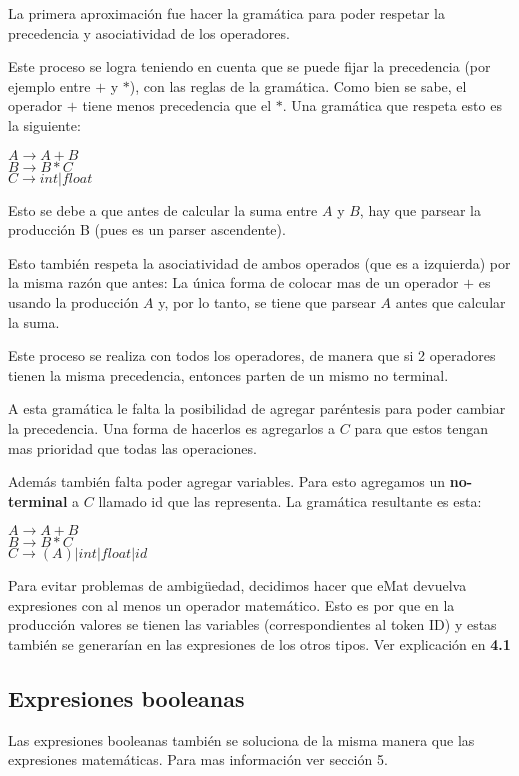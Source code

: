 La primera aproximación fue hacer la gramática para poder respetar la precedencia y asociatividad de los operadores. 

Este proceso se logra teniendo en cuenta que se puede fijar la precedencia (por ejemplo entre $+$ y $*$), con las reglas de la gramática. Como bien se sabe, el operador $+$ tiene menos precedencia que el $*$. Una gramática que respeta esto es la siguiente:

\begin{center}
$A \rightarrow A + B$ \\
$B \rightarrow B * C$ \\
$C \rightarrow int | float$ 
\end{center}
Esto se debe a que antes de calcular la suma entre $A$ y $B$, hay que parsear la producción B (pues es un parser ascendente). 

Esto también respeta la asociatividad de ambos operados (que es a izquierda) por la misma razón que antes: La única forma de colocar mas de un operador $+$ es usando la producción $A$ y, por lo tanto, se tiene que parsear $A$ antes que calcular la suma.

Este proceso se realiza con todos los operadores, de manera que si 2 operadores tienen la misma precedencia, entonces parten de un mismo no terminal.

A esta gramática le falta la posibilidad de agregar paréntesis para poder cambiar la precedencia. Una forma de hacerlos es agregarlos a $C$ para que estos tengan mas prioridad que todas las operaciones.

Además también falta poder agregar variables. Para esto agregamos un \textbf{no-terminal} a $C$ llamado id que las representa. La gramática resultante es esta:
\begin{center}
$A \rightarrow A + B$ \\
$B \rightarrow B * C$ \\
$C \rightarrow (A) | int | float | id$ 
\end{center}

Para evitar problemas de ambigüedad, decidimos hacer que eMat devuelva expresiones con al menos un operador matemático. Esto es por que en la producción valores se tienen las variables (correspondientes al token ID) y estas
también se generarían en las expresiones de los otros tipos. Ver explicación en \textbf{4.1}

\subsection{Expresiones booleanas}
Las expresiones booleanas también se soluciona de la misma manera que las expresiones matemáticas. Para mas información ver sección 5.

